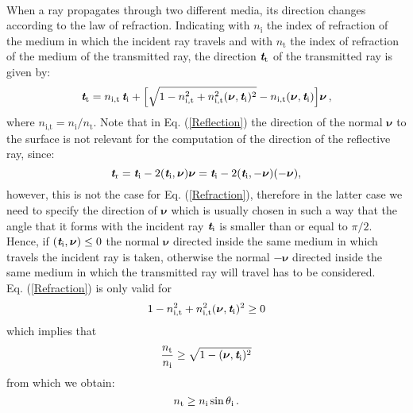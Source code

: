 \\ When a ray propagates through two different media, its direction changes according to the law of refraction. 
Indicating with $n_\textrm{i}$ the index of refraction of the medium in which the incident ray travels and with $n_\textrm{t}$ the index of refraction of the medium of the transmitted ray, the direction $\textit{\textbf{t}}_\textrm{t}$ of the transmitted ray is given by:
\begin{equation}\label{Refraction}
\textit{\textbf{t}}_\textrm{t} = n_{\textrm{i},\textrm{t}}\,\textit{\textbf{t}}_\textrm{i}+
\Big[\sqrt{1-n_{\textrm{i},\textrm{t}}^2+n_{\textrm{i},\textrm{t}}^2(\boldsymbol{\nu},\textit{\textbf{t}}_\textrm{i})^2}-n_{\textrm{i},\textrm{t}}(\boldsymbol{\nu},\textit{\textbf{t}}_\textrm{i}) \Big]\boldsymbol{\nu}\,,
\end{equation}
where $n_{\textrm{i},\textrm{t}}=n_\textrm{i}/n_\textrm{t}$. Note that in Eq. (\ref{Reflection}) the direction of the normal $\boldsymbol{\nu}$ to the surface is not relevant for the computation of the direction of the reflective ray, since:
\begin{equation}
\textit{\textbf{t}}_\textrm{r} = \textit{\textbf{t}}_\textrm{i}-2(\textit{\textbf{t}}_\textrm{i},\boldsymbol{\nu})\boldsymbol{\nu}= \textit{\textbf{t}}_\textrm{i}-2(\textit{\textbf{t}}_\textrm{i},-\boldsymbol{\nu})(-\boldsymbol{\nu}) ,
\end{equation}
however, this is not the case for Eq. (\ref{Refraction}), therefore in the latter case we need to specify the direction of $\boldsymbol{\nu}$ which is usually chosen in such a way that the angle that it forms with the incident ray $\textit{\textbf{t}}_\textrm{i}$ is smaller than or equal to $\pi/2$. Hence, if $(\textit{\textbf{t}}_\textrm{i}, \boldsymbol{\nu})\leq0$ the normal $\boldsymbol{\nu}$ directed inside the same medium in which travels the incident ray is taken, otherwise the normal $-\boldsymbol{\nu}$ directed inside the same medium in which the transmitted ray will travel has to be considered.
\\\indent
Eq. (\ref{Refraction}) is only valid for 
\begin{equation}\label{tir}
1-n_{\textrm{i},\textrm{t}}^2+n_{\textrm{i},\textrm{t}}^2(\boldsymbol{\nu},\textit{\textbf{t}}_\textrm{i})^2\geq 0 
\end{equation} which implies that
\begin{equation}
\frac{n_\textrm{t}}{n_\textrm{i}}\geq \sqrt{1-(\boldsymbol{\nu},\textit{\textbf{t}}_\textrm{i})^2}
\end{equation}
from which we obtain:
\begin{equation}
 n_\textrm{t}\geq n_\textrm{i} \sin\mbox{$\theta$}_\textrm{i}\,.
\end{equation}
